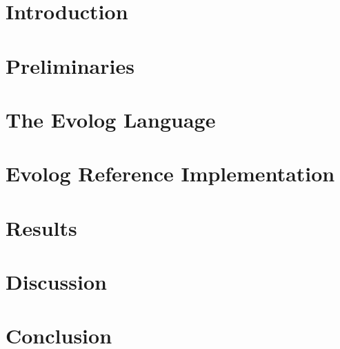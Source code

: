 \documentclass[draft,final]{vutinfth} %
\theoremstyle{definition}
\begin{document}

\tableofcontents %

\mainmatter

\chapter{Introduction}

\chapter{Preliminaries}


\chapter{The Evolog Language}
\label{chap:language}


\chapter{Evolog Reference Implementation}
\label{chap:implementation}


\chapter{Results}
\label{chap:results}


\chapter{Discussion}
\label{chap:discussion}


\chapter{Conclusion}
\label{chap:conclusion}


\appendix


\backmatter

\listoffigures %

\cleardoublepage %
\listoftables %

\listofalgorithms
{}

\printindex

\printglossaries



\end{document}
